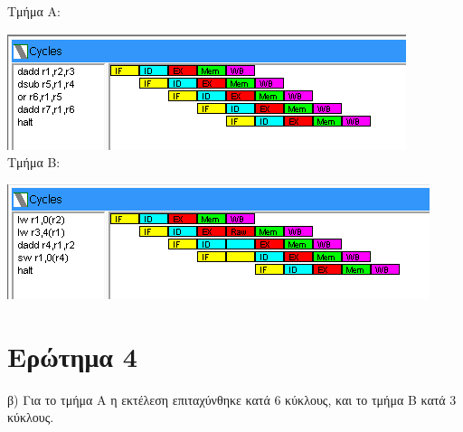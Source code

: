 \documentclass[12pt]{article}
\begin{document}
Τμήμα Α:

\includegraphics[width=\textwidth]{res/fwd_p1.png} \\

Τμήμα Β:

\includegraphics[width=\textwidth]{res/fwd_p2.png}

\section{Ερώτημα 4}

β) Για το τμήμα Α η εκτέλεση επιταχύνθηκε κατά 6 κύκλους, και το τμήμα Β κατά 3
κύκλους.
\end{document}
